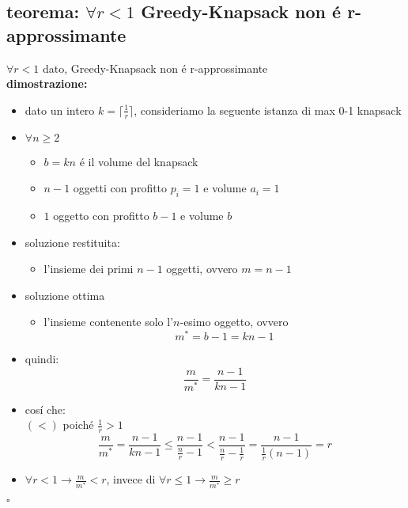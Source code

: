 
\subsection*{teorema: $\forall r<1$ Greedy-Knapsack non \'e r-approssimante}
\begin{flushleft}
	$\forall r<1$ dato, Greedy-Knapsack non \'e r-approssimante \newline \\
	\textbf{dimostrazione:}
	\begin{itemize}
		\item dato un intero $k=\lceil\frac{1}{r}\rceil$, consideriamo la seguente istanza di max 0-1 knapsack
		\item $\forall n\geq 2$
		\begin{itemize}
			\item $b=kn$ \'e il volume del knapsack
			\item $n-1$ oggetti con profitto $p_i=1$ e volume $a_i=1$
			\item $1$ oggetto con profitto $b-1$ e volume $b$
		\end{itemize}
		\item soluzione restituita:
		\begin{itemize}
			\item l'insieme dei primi $n-1$ oggetti, ovvero $m=n-1$
		\end{itemize}
		\item soluzione ottima
		\begin{itemize}
			\item l'insieme contenente solo l'$n$-esimo oggetto, ovvero $$m^*=b-1=kn-1$$
		\end{itemize}
		\vspace{0.5cm}
		\item quindi: $$\frac{m}{m^*}=\frac{n-1}{kn-1}$$
		\item cos\'i che: \newline \\
			\hspace{8cm}$(<)$ poich\'e $\frac{1}{r}>1$
			$$\frac{m}{m^*}=\frac{n-1}{kn-1}\leq\frac{n-1}{\frac{n}{r}-1}<\frac{n-1}{\frac{n}{r}-\frac{1}{r}}=\frac{n-1}{\frac{1}{r}(n-1)}=r$$
		\item \color{gray} $\forall r<1\rightarrow\frac{m}{m^*}<r$, invece di $\forall r\leq 1\rightarrow\frac{m}{m^*}\geq r$
	\end{itemize}
	\hfill$\square$
\end{flushleft}


